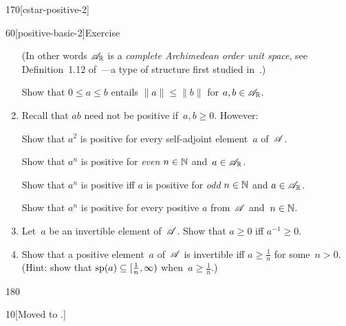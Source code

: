\begin{parsec}{170}[cstar-positive-2]
\begin{point}{60}[positive-basic-2]{Exercise}
\begin{enumerate}
(In other words
$\mathscr{A}_{\mathbb{R}}$ is a \emph{complete Archimedean order unit space},
see Definition~1.12 of~\cite{alfsen2012}---a 
type of structure first studied in~\cite{kadison1951}.)


Show that $0\leq a \leq b$ entails $\|a\|\leq \|b\|$
for $a,b\in\mathscr{A}_{\mathbb{R}}$.

\item 
Recall that $ab$ need not be positive if~$a,b\geq 0$. However:

Show that $a^2$ is positive for every self-adjoint element~$a$ of~$\mathscr{A}$.

Show that $a^n$ is positive for \emph{even} $n\in \mathbb{N}$ and~$a\in\mathscr{A}_{\mathbb{R}}$.

Show that $a^n$ is positive iff $a$ is positive for \emph{odd} $n\in \mathbb{N}$
and $a\in\mathscr{A}_{\mathbb{R}}$.

Show that $a^n$ is positive
for every positive $a$ from~$\mathscr{A}$ and~$n\in \mathbb{N}$.
\item
Let~$a$ be an invertible element of~$\mathscr{A}$.
Show that $a\geq 0$ iff $a^{-1}\geq 0$.

\item
Show that a positive element~$a$ of~$\mathscr{A}$ is invertible
iff $a\geq \frac{1}{n}$ for some~$n>0$.
(Hint: show that $\mathrm{sp}(a)\subseteq [\frac{1}{n},\infty)$
		when~$a\geq \frac{1}{n}$.)
\end{enumerate}%
\spacingfix{}%
\end{point}%
\end{parsec}%
\begin{parsec}{180}%
\begin{point}{10}{[Moved to .]}
\end{point}
\end{parsec}

